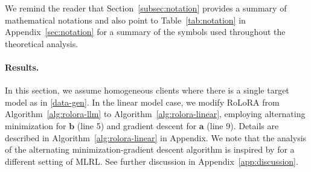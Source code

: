 \documentclass{article}
\theoremstyle{plain}
\theoremstyle{definition}
\theoremstyle{remark}
\begin{document}
 We remind the reader that Section~\ref{subsec:notation} provides a summary of mathematical notations and also point to
 Table~\ref{tab:notation} in Appendix~\ref{sec:notation} for a summary of the symbols used throughout the theoretical analysis.
 
\paragraph{Results.}
In this section, we assume homogeneous clients where there is a single target model as in \eqref{data-gen}. In the linear model case, we modify RoLoRA from Algorithm~\ref{alg:rolora-llm} to Algorithm~\ref{alg:rolora-linear}, employing alternating minimization for $\mathbf{b}$ (line 5) and gradient descent for $\mathbf{a}$ (line 9). Details are described in Algorithm~\ref{alg:rolora-linear} in Appendix.  We note that the analysis of the alternating minimization-gradient descent algorithm is inspired by \cite{pmlr-v139-collins21a,seyedehsara2022fastsampleefficientfederatedlow,Vaswani_2024} for a different setting of MLRL. See further discussion in Appendix~\ref{app:discussion}.
\end{document}
